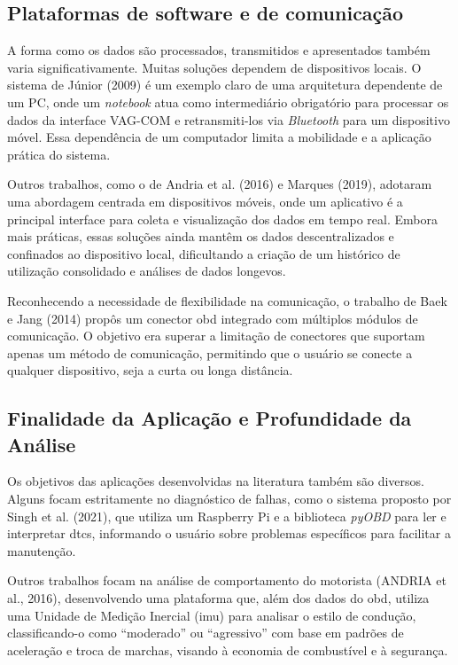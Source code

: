 \documentclass[a4paper, 12pt]{article}
\begin{document}
\subsection{Plataformas de software e de comunicação}

A forma como os dados são processados, transmitidos e apresentados também varia significativamente. Muitas soluções dependem de dispositivos locais. O sistema de Júnior (2009) é um exemplo claro de uma arquitetura dependente de um PC, onde um {\textit{notebook} atua como intermediário obrigatório} para processar os dados da interface VAG-COM e retransmiti-los via \textit{Bluetooth} para um dispositivo móvel. Essa dependência de um computador limita a mobilidade e a aplicação prática do sistema.

Outros trabalhos, como o de {Andria et al. (2016)} e {Marques (2019)}, adotaram uma abordagem centrada em dispositivos móveis, onde um aplicativo é a principal interface para coleta e visualização dos dados em tempo real. Embora mais práticas, essas soluções ainda mantêm os dados descentralizados e confinados ao dispositivo local, dificultando a criação de um histórico de utilização consolidado e análises de dados longevos.

Reconhecendo a necessidade de flexibilidade na comunicação, o trabalho de Baek e Jang (2014) propôs um conector \acrshort{obd} integrado com múltiplos módulos de comunicação. O objetivo era superar a limitação de conectores que suportam apenas um método de comunicação, permitindo que o usuário se conecte a qualquer dispositivo, seja a curta ou longa distância.

\subsection{Finalidade da Aplicação e Profundidade da Análise}

Os objetivos das aplicações desenvolvidas na literatura também são diversos. Alguns focam estritamente no diagnóstico de falhas, como o sistema proposto por Singh et al. (2021), que utiliza um Raspberry Pi e a biblioteca \textit{pyOBD} para ler e interpretar \acrshort{dtc}s, informando o usuário sobre problemas específicos para facilitar a manutenção.

Outros trabalhos focam na análise de comportamento do motorista (ANDRIA et al., 2016), desenvolvendo uma plataforma que, além dos dados do \acrshort{obd}, utiliza uma Unidade de Medição Inercial (\acrshort{imu}) para analisar o estilo de condução, classificando-o como ``moderado'' ou ``agressivo'' com base em padrões de aceleração e troca de marchas, visando à economia de combustível e à segurança.
\end{document}
